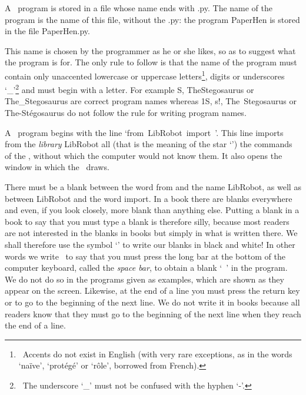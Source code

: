 A \python\ program is stored in a file whose name ends with {\idt .py}.
The name of the program is the name of this file, without the {\idt .py}: the program
{\idt PaperHen} is stored in the file {\idt PaperHen.py}.

This name is chosen by the programmer
as he or she likes, so as to suggest what the program is for.
 The only rule to fol\-low is that the name of the program
must contain only unaccented lowercase or
uppercase letters\footnote{\ Accents do not exist in English
(with very rare exceptions, as in the words `naïve', `protégé' or
`rôle', borrowed from French).}, digits or
underscores `\_'\footnote{\ The underscore `\_' must not be confused with the hyphen `-'.}
and must begin with a letter. For example {\idt  S},
{\idt  TheStegosaurus} or {\idt  The\_Stegosaurus} are correct program
names whereas {\idt  1S},
{\idt  s!}, {\idt  The\ Stegosaurus} or {\idt  The-Stégosaurus} do not follow
the rule for writing program names.

A \python\ program begins with the line `{\mcl from}\ {\idt LibRobot}\ {\mcl import}\ {\idt *}'.
This line
imports from the
{\em library} {\idt LibRobot} all (that is the meaning of the star `{\idt *}')
the commands of the
\robot, without which the computer would not know them. It also opens the window
in which the \robot\ draws.

There must be a blank
between the word {\mcl from} and the name {\idt LibRobot}, as well as between {\idt LibRobot} and the
word {\mcl import}. In a book there are blanks everywhere and even, if you look closely,
more blank than anything else. Putting a blank in a book to say that you must type
a blank is therefore silly, because most readers are not interested in the
blanks in books but simply in what is written there.
We shall therefore use the symbol `\blanc' to write our blanks in black and \hbox{white!}
In other words we write \blanc\ to say that you must press the long bar
at the bottom of the com\-pu\-ter keyboard, called the
{\em space bar},
to obtain a blank `\ ' in the program.
We do not do so in the programs given as examples, which are
shown as they appear on the screen. Likewise, at the end of a
line you must press the return key
\framebox[11.mm][l]{$\hookleftarrow$~~~}\hspace{0.3ex} or \hspace{0.3ex}\hspace{0.3ex} to go to the beginning of the
next line. We do not write it in books because all readers know
that they must go to the beginning of the next line when they reach the end of a line.

